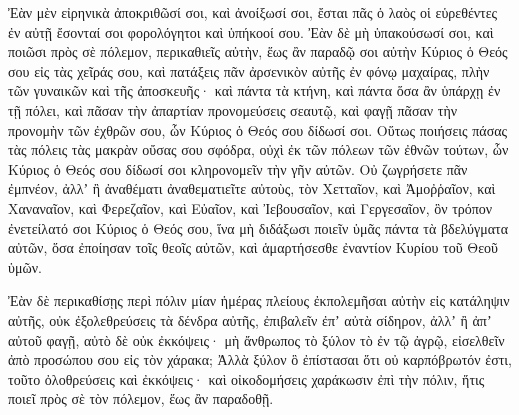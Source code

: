 {Ἐὰν μὲν εἰρηνικὰ ἀποκριθῶσί σοι, καὶ ἀνοίξωσί σοι, ἔσται πᾶς ὁ λαὸς οἱ εὑρεθέντες ἐν αὐτῇ ἔσονταί σοι φορολόγητοι καὶ ὑπήκοοί σου.
Ἐὰν δὲ μὴ ὑπακούσωσί σοι, καὶ ποιῶσι πρὸς σὲ πόλεμον, περικαθιεῖς αὐτὴν,
ἕως ἂν παραδῷ σοι αὐτὴν Κύριος ὁ Θεός σου εἰς τὰς χεῖράς σου, καὶ πατάξεις πᾶν ἀρσενικὸν αὐτῆς ἐν φόνῳ μαχαίρας,
πλὴν τῶν γυναικῶν καὶ τῆς ἀποσκευῆς· καὶ πάντα τὰ κτήνη, καὶ πάντα ὅσα ἂν ὑπάρχῃ ἐν τῇ πόλει, καὶ πᾶσαν τὴν ἀπαρτίαν προνομεύσεις σεαυτῷ, καὶ φαγῇ πᾶσαν τὴν προνομὴν τῶν ἐχθρῶν σου, ὧν Κύριος ὁ Θεός σου δίδωσί σοι.
Οὕτως ποιήσεις πάσας τὰς πόλεις τὰς μακρὰν οὔσας σου σφόδρα, οὐχὶ ἐκ τῶν πόλεων τῶν ἐθνῶν τούτων,
ὧν Κύριος ὁ Θεός σου δίδωσί σοι κληρονομεῖν τὴν γῆν αὐτῶν. Οὐ ζωγρήσετε πᾶν ἐμπνέον,
ἀλλʼ ἢ ἀναθέματι ἀναθεματιεῖτε αὐτοὺς, τὸν Χετταῖον, καὶ Ἀμοῤῥαῖον, καὶ Χαναναῖον, καὶ Φερεζαῖον, καὶ Εὐαῖον, καὶ Ἰεβουσαῖον, καὶ Γεργεσαῖον, ὃν τρόπον ἐνετείλατό σοι Κύριος ὁ Θεός σου,
ἵνα μὴ διδάξωσι ποιεῖν ὑμᾶς πάντα τὰ βδελύγματα αὐτῶν, ὅσα ἐποίησαν τοῖς θεοῖς αὐτῶν, καὶ ἁμαρτήσεσθε ἐναντίον Κυρίου τοῦ Θεοῦ ὑμῶν.
\par }{\PP {}Ἐὰν δὲ περικαθίσῃς περὶ πόλιν μίαν ἡμέρας πλείους ἐκπολεμῆσαι αὐτὴν εἰς κατάληψιν αὐτῆς, οὐκ ἐξολεθρεύσεις τὰ δένδρα αὐτῆς, ἐπιβαλεῖν ἐπʼ αὐτὰ σίδηρον, ἀλλʼ ἢ ἀπʼ αὐτοῦ φαγῇ, αὐτὸ δὲ οὐκ ἐκκόψεις· μὴ ἄνθρωπος τὸ ξύλον τὸ ἐν τῷ ἀγρῷ, εἰσελθεῖν ἀπὸ προσώπου σου εἰς τὸν χάρακα;
Ἀλλὰ ξύλον ὃ ἐπίστασαι ὅτι οὐ καρπόβρωτόν ἐστι, τοῦτο ὀλοθρεύσεις καὶ ἐκκόψεις· καὶ οἰκοδομήσεις χαράκωσιν ἐπὶ τὴν πόλιν, ἥτις ποιεῖ πρὸς σὲ τὸν πόλεμον, ἕως ἂν παραδοθῇ.

}
